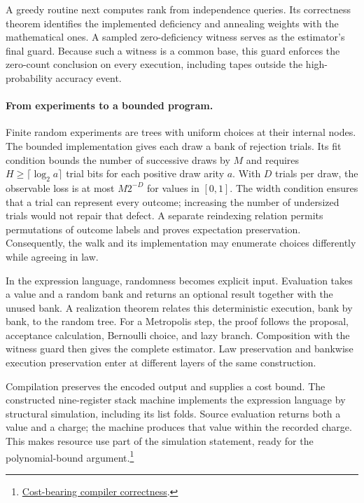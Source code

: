 A greedy routine next computes rank from independence queries. Its
correctness theorem identifies the implemented deficiency and annealing
weights with the mathematical ones. A sampled zero-deficiency witness
serves as the estimator's final guard. Because such a witness is a common
base, this guard enforces the zero-count conclusion on every execution,
including tapes outside the high-probability accuracy event.

\paragraph{From experiments to a bounded program.}
Finite random experiments are trees with uniform choices at their internal
nodes. The bounded implementation gives each draw a bank of rejection
trials. Its fit condition bounds the number of successive draws by $M$
and requires $H\geq\lceil\log_2 a\rceil$ trial bits for each positive draw
arity $a$. With $D$ trials per draw, the observable loss is at most
$M2^{-D}$ for values in $[0,1]$. The width condition ensures that a trial
can represent every outcome; increasing the number of undersized trials
would not repair that defect. A separate reindexing relation permits
permutations of outcome labels and proves expectation preservation.
Consequently, the walk and its implementation may enumerate choices
differently while agreeing in law.

In the expression language, randomness becomes explicit input. Evaluation
takes a value and a random bank and returns an optional result together
with the unused bank. A realization theorem relates this deterministic
execution, bank by bank, to the random tree. For a Metropolis step, the
proof follows the proposal, acceptance calculation, Bernoulli choice, and
lazy branch. Composition with the witness guard then gives the complete
estimator. Law preservation and bankwise execution preservation enter at
different layers of the same construction.

Compilation preserves the encoded output and supplies a cost bound.
The constructed nine-register stack machine implements the expression
language by structural simulation, including its list folds. Source
evaluation returns both a value and a charge; the machine produces that
value within the recorded charge. This makes resource use part of the
simulation statement, ready for the polynomial-bound argument.\footnote{\href{https://github.com/openai/math/blob/fd4aeeb2ee4fc729c18d98444fed42fd0529eeeb/lean/OAI/Combinatorics/MatroidCounting/CommonBases.lean\#L16459-L16620}{Cost-bearing compiler correctness}.}

